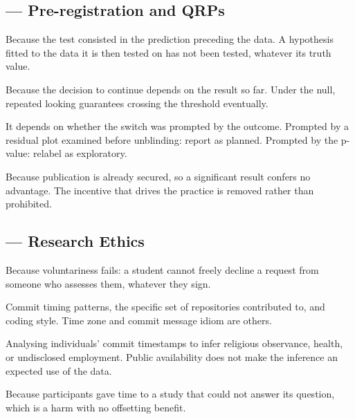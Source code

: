 \subsection*{ --- Pre-registration and QRPs}
\begin{tightnum}
  \item Because the test consisted in the prediction preceding the data. A
    hypothesis fitted to the data it is then tested on has not been tested,
    whatever its truth value.
  \item Because the decision to continue depends on the result so far. Under the
    null, repeated looking guarantees crossing the threshold eventually.
  \item It depends on whether the switch was prompted by the outcome. Prompted
    by a residual plot examined before unblinding: report as planned. Prompted
    by the p-value: relabel as exploratory.
  \item Because publication is already secured, so a significant result confers
    no advantage. The incentive that drives the practice is removed rather than
    prohibited.
\end{tightnum}

\subsection*{ --- Research Ethics}
\begin{tightnum}
  \item Because voluntariness fails: a student cannot freely decline a request
    from someone who assesses them, whatever they sign.
  \item Commit timing patterns, the specific set of repositories contributed to,
    and coding style. Time zone and commit message idiom are others.
  \item Analysing individuals' commit timestamps to infer religious observance,
    health, or undisclosed employment. Public availability does not make the
    inference an expected use of the data.
  \item Because participants gave time to a study that could not answer its
    question, which is a harm with no offsetting benefit.
\end{tightnum}

